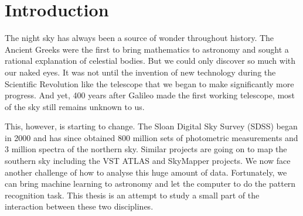 
\chapter{Introduction}
\label{cha:intro}
The night sky has always been a source of wonder throughout history.
The Ancient Greeks were the first to bring 
mathematics to astronomy and sought a rational explanation of celestial bodies.
But we could only discover so much with our naked eyes. It was not until the invention
of new technology during the Scientific Revolution like the telescope that we began to
make significantly more progress. And yet, 400 years after Galileo made the first working
telescope, most of the sky still remains unknown to us.

This, however, is starting to change. The Sloan Digital Sky Survey (SDSS) began
in 2000 and has since obtained 800 million sets of photometric measurements
and 3 million spectra of the northern sky. Similar projects are going on
to map the southern sky including the VST ATLAS and SkyMapper projects.
 We now face another challenge of how
to analyse this huge amount of data. Fortunately, we can bring machine learning
to astronomy and let the computer to do the pattern recognition task.
This thesis is an attempt to study a small part of the interaction between these
two disciplines.

